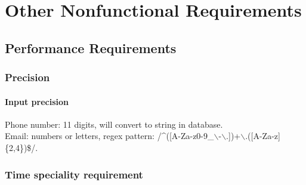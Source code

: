 \documentclass[16pt]{scrreprt}
\begin{document}
%
%
%


\chapter{Other Nonfunctional Requirements}
\label{Other Nonfunctional Requirements}
\section{Performance Requirements}
\subsection{Precision}
\subsubsection{Input precision}
Phone number: 11 digits, will convert to string in database. \\
Email: numbers or letters, regex pattern: /\^ \space([A-Za-z0-9\_$\backslash$-$\backslash$.])+$\backslash$.([A-Za-z]\{2,4\})\$/. \\

\subsection{Time speciality requirement}
\end{document}
